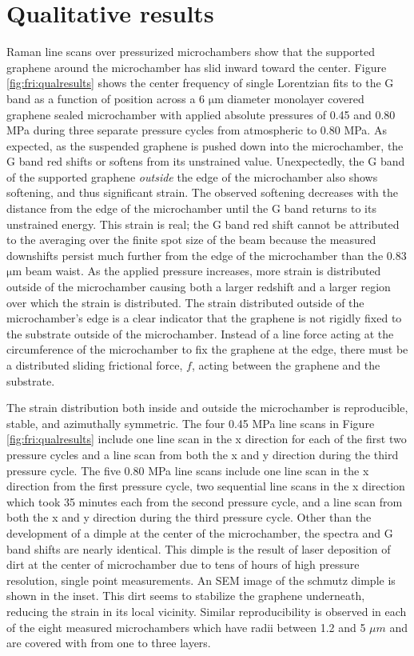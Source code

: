 \section{Qualitative results}
Raman line scans over pressurized microchambers show that the supported graphene around the microchamber has slid inward toward the center.
Figure \ref{fig:fri:qualresults} shows the center frequency of single Lorentzian fits to the G band as a function of position across a 6 $\mathrm{\mu}$m diameter monolayer covered graphene sealed microchamber with applied absolute pressures of 0.45 and 0.80 MPa during three separate pressure cycles from atmospheric to 0.80 MPa.
As expected, as the suspended graphene is pushed down into the microchamber, the G band red shifts or softens from its unstrained value.
Unexpectedly, the G band of the supported graphene \emph{outside} the edge of the microchamber also shows softening, and thus significant strain.
The observed softening decreases with the distance from the edge of the microchamber until the G band returns to its unstrained energy.
This strain is real; the G band red shift cannot be attributed to the averaging over the finite spot size of the beam because the measured downshifts persist much further from the edge of the microchamber than the 0.83 $\mathrm{\mu}$m beam waist.
As the applied pressure increases, more strain is distributed outside of the microchamber causing both a larger redshift and a larger region over which the strain is distributed.
The strain distributed outside of the microchamber's edge is a clear indicator that the graphene is not rigidly fixed to the substrate outside of the microchamber.
Instead of a line force acting at the circumference of the microchamber to fix the graphene at the edge, there must be a distributed sliding frictional force, $f$, acting between the graphene and the substrate.

The strain distribution both inside and outside the microchamber is reproducible, stable, and azimuthally symmetric.
The four 0.45 MPa line scans in Figure \ref{fig:fri:qualresults} include one line scan in the x direction for each of the first two pressure cycles and a line scan from both the x and y direction during the third pressure cycle.
The five 0.80 MPa line scans include one line scan in the x direction from the first pressure cycle, two sequential line scans in the x direction which took 35 minutes each from the second pressure cycle, and a line scan from both the x and y direction during the third pressure cycle.
Other than the development of a dimple at the center of the microchamber, the spectra and G band shifts are nearly identical.
This dimple is the result of laser deposition of dirt at the center of microchamber due to tens of hours of high pressure resolution, single point measurements.
An SEM image of the schmutz dimple is shown in the inset.
This dirt seems to stabilize the graphene underneath, reducing the strain in its local vicinity.
Similar reproducibility is observed in each of the eight measured microchambers which have radii between 1.2 and 5 $\mu m$ and are covered with from one to three layers.

